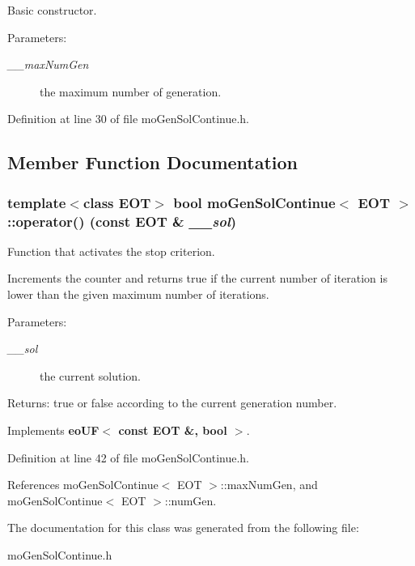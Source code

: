 Basic constructor. 

\begin{Desc}
\item[Parameters:]
\begin{description}
\item[{\em \_\-\_\-maxNumGen}]the maximum number of generation. \end{description}
\end{Desc}


Definition at line 30 of file moGenSolContinue.h.

\subsection{Member Function Documentation}
\subsubsection{\setlength{\rightskip}{0pt plus 5cm}template$<$class EOT$>$ bool {\bf moGenSolContinue}$<$ EOT $>$::operator() (const EOT \& {\em \_\-\_\-sol})\hspace{0.3cm}{\tt  [inline, virtual]}}\label{classmo_gen_sol_continue_457257cd73b474d6f7783d84d02c2e61}


Function that activates the stop criterion. 

Increments the counter and returns true if the current number of iteration is lower than the given maximum number of iterations.

\begin{Desc}
\item[Parameters:]
\begin{description}
\item[{\em \_\-\_\-sol}]the current solution. \end{description}
\end{Desc}
\begin{Desc}
\item[Returns:]true or false according to the current generation number. \end{Desc}


Implements {\bf eoUF$<$ const EOT \&, bool $>$}.

Definition at line 42 of file moGenSolContinue.h.

References moGenSolContinue$<$ EOT $>$::maxNumGen, and moGenSolContinue$<$ EOT $>$::numGen.

The documentation for this class was generated from the following file:\begin{CompactItemize}
\item 
moGenSolContinue.h\end{CompactItemize}
